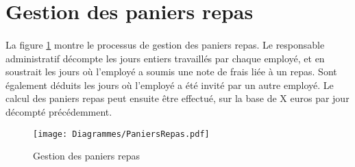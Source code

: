 \section{Gestion des paniers repas}
\paragraph{} La figure \ref{repas} montre le processus de gestion des paniers repas. Le responsable administratif décompte les jours entiers travaillés par chaque employé, et en soustrait les jours où l'employé a soumis une note de frais liée à un repas. Sont également déduits les jours où l'employé a été invité par un autre employé. Le calcul des paniers repas peut ensuite être effectué, sur la base de X euros par jour décompté précédemment.



\begin{figure}[H]
\centering
	\texttt{[image: Diagrammes/PaniersRepas.pdf]}
	\caption{Gestion des paniers repas}
	\label{repas}
\end{figure}






